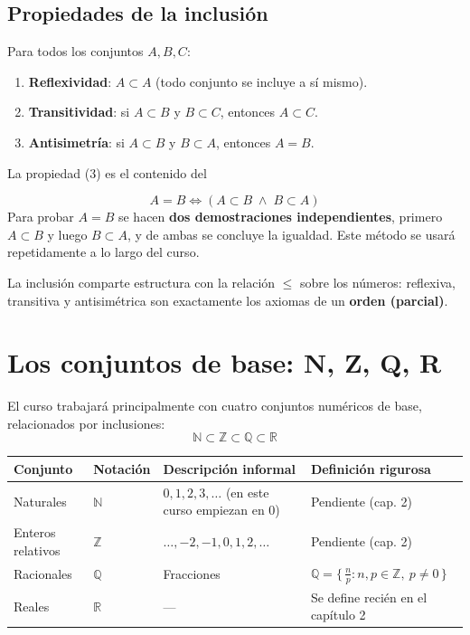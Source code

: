 \documentclass[12pt,a4paper]{article}
\begin{document}
\subsection{Propiedades de la inclusión}

Para todos los conjuntos $A, B, C$:

\begin{enumerate}
  \item \textbf{Reflexividad}: $A \subset A$ (todo conjunto se incluye a
    sí mismo).
  \item \textbf{Transitividad}: si $A \subset B$ y $B \subset C$,
    entonces $A \subset C$.
  \item \textbf{Antisimetría}: si $A \subset B$ y $B \subset A$, entonces
    $A = B$.
\end{enumerate}

La propiedad (3) es el contenido del

\begin{keybox}
\[
\boxed{A = B \iff (A \subset B \;\wedge\; B \subset A)}
\]
Para probar $A = B$ se hacen \textbf{dos demostraciones independientes},
primero $A \subset B$ y luego $B \subset A$, y de ambas se concluye la
igualdad. Este método se usará repetidamente a lo largo del curso.
\end{keybox}

\begin{notebox}
La inclusión comparte estructura con la relación $\le$ sobre los números:
reflexiva, transitiva y antisimétrica son exactamente los axiomas de un
\textbf{orden (parcial)}.
\end{notebox}

\section{Los conjuntos de base: N, Z, Q, R}

El curso trabajará principalmente con cuatro conjuntos numéricos de base,
relacionados por inclusiones:
\[
\boxed{\mathbb{N} \subset \mathbb{Z} \subset \mathbb{Q} \subset \mathbb{R}}
\]

\begin{table}[H]
\centering
\begin{tabularx}{\textwidth}{@{}llXX@{}}
\toprule
Conjunto & Notación & Descripción informal & Definición rigurosa \\
\midrule
Naturales & $\mathbb{N}$ & $0, 1, 2, 3, \ldots$ (en este curso empiezan en $0$) & Pendiente (cap. 2) \\
Enteros relativos & $\mathbb{Z}$ & $\ldots, -2, -1, 0, 1, 2, \ldots$ & Pendiente (cap. 2) \\
Racionales & $\mathbb{Q}$ & Fracciones & $\mathbb{Q} = \{\, \tfrac{n}{p} : n, p \in \mathbb{Z},\ p \neq 0 \,\}$ \\
Reales & $\mathbb{R}$ & --- & Se define recién en el capítulo 2 \\
\bottomrule
\end{tabularx}
\end{table}
\end{document}
